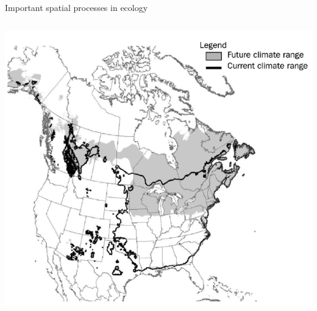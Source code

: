 \documentclass{eecslides}
\begin{document}
\begin{frame}{Important spatial processes in ecology}
\begin{columns}
\begin{column}{0.5\textwidth}
\begin{center}
					\includegraphics[height=0.3\textheight]{range}
				\end{center}
			\end{column}
		\end{columns}	 


	\end{frame}

\end{document}
